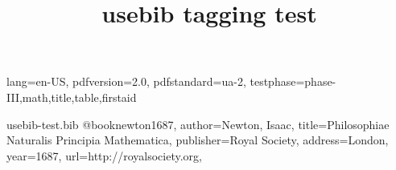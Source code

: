 \DocumentMetadata
  {
    lang=en-US,
    pdfversion=2.0,
    pdfstandard=ua-2,
    testphase={phase-III,math,title,table,firstaid}
  }
\begin{filecontents}{usebib-test.bib}
@book{newton1687,
author={Newton, Isaac},
title={Philosophiae Naturalis Principia Mathematica},
publisher={Royal Society},
address={London},
year={1687},
url={http://royalsociety.org},
}
\end{filecontents}
\documentclass{article}

\usepackage{hyperref}
\usepackage{usebib}

\title{usebib tagging test}




\cite{newton1687} published by the  of . See .




